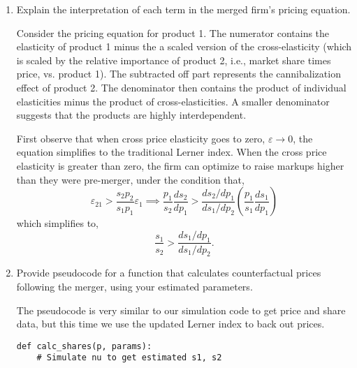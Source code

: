 \documentclass{article}
\begin{document}
\begin{enumerate}
\begin{enumerate}
\item Explain the interpretation of each term in the merged firm’s pricing equation.

\begin{answer}
Consider the pricing equation for product 1. The numerator contains the elasticity of product 1 minus the a scaled version of the cross-elasticity (which is scaled by the relative importance of product 2, i.e., market share times price, vs. product 1). The subtracted off part represents the cannibalization effect of product 2. The denominator then contains the product of individual elasticities minus the product of cross-elasticities. A smaller denominator suggests that the products are highly interdependent. 

First observe that when cross price elasticity goes to zero, $\varepsilon\rightarrow 0$, the equation simplifies to the traditional Lerner index. When the cross price elasticity is greater than zero, the firm can optimize to raise markups higher than they were pre-merger, under the condition that,
$$\varepsilon_{21} >\frac{s_2p_2}{s_1p_1} \varepsilon_1  \implies \frac{p_1}{s_2}\frac{d s_2}{d p_1} > \frac{ds_2/dp_1}{ds_1/dp_2} (\frac{p_1}{s_1} \frac{d s_1}{d p_1}) 
$$ 
which simplifies to,
$$\frac{s_1}{s_2} > \frac{ds_1/dp_1}{ds_1/dp_2}.$$
\end{answer}

\item Provide pseudocode for a function that calculates counterfactual prices following the
merger, using your estimated parameters.

\begin{answer}
The pseudocode is very similar to our simulation code to get price and share data, but this time we use the updated Lerner index to back out prices.
\begin{verbatim}
def calc_shares(p, params):
    # Simulate nu to get estimated s1, s2


\end{verbatim}
\end{answer}
\end{enumerate}
\end{enumerate}
\end{document}
